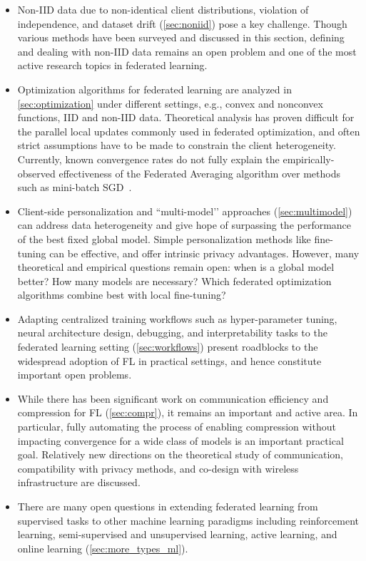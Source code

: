 \documentclass[11pt]{article}
\begin{document}
\begin{itemize}

\item Non-IID data due to non-identical client distributions, violation of independence, and dataset drift (\cref{sec:noniid}) pose a key challenge. Though various methods have been surveyed and discussed in this section, defining and dealing with non-IID data remains an open problem and one of the most active research topics in federated learning.

\item Optimization algorithms for federated learning are analyzed in \cref{sec:optimization} under different settings, e.g., convex and nonconvex functions, IID and non-IID data. Theoretical analysis has proven difficult for the parallel local updates commonly used in federated optimization, and often strict assumptions have to be made to constrain the client heterogeneity. Currently, known convergence rates do not fully explain the empirically-observed effectiveness of the Federated Averaging algorithm over methods such as mini-batch SGD~\citep{woodworth2020local}.

\item Client-side personalization and ``multi-model’’ approaches (\cref{sec:multimodel}) can address data heterogeneity and give hope of surpassing the performance of the best fixed global model. Simple personalization methods like fine-tuning can be effective, and offer intrinsic privacy advantages. However, many theoretical and empirical questions remain open: when is a global model better? How many models are necessary? Which federated optimization algorithms combine best with local fine-tuning?

\item Adapting centralized training workflows such as hyper-parameter tuning, neural architecture design, debugging, and interpretability tasks to the federated learning setting (\cref{sec:workflows}) present roadblocks to the widespread adoption of FL in practical settings, and hence constitute important open problems. 

\item While there has been significant work on communication efficiency and compression for FL (\cref{sec:compr}), it remains an important and active area. In particular, fully automating the process of enabling compression without impacting convergence for a wide class of models is an important practical goal. Relatively new directions on the theoretical study of communication, compatibility with privacy methods, and co-design with wireless infrastructure are discussed.

\item There are many open questions in extending federated learning from supervised tasks to other machine learning paradigms including reinforcement learning, semi-supervised and unsupervised learning, active learning, and online learning (\cref{sec:more_types_ml}).
\end{itemize}
\end{document}
